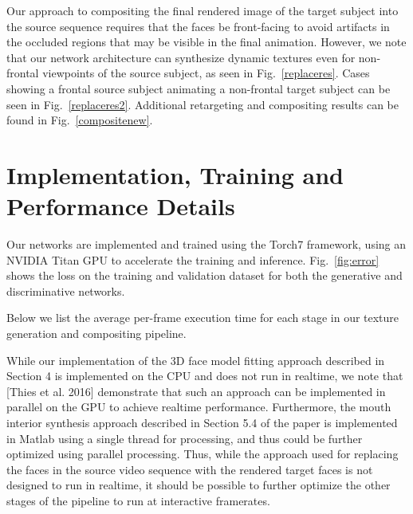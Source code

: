 \documentclass[10pt,twocolumn,letterpaper]{article}
\begin{document}
Our approach to compositing the final rendered image of the target subject into the source sequence requires that the faces be front-facing to avoid artifacts in the occluded regions that may be visible in the final animation. However, we note that our network architecture can synthesize dynamic textures even for non-frontal viewpoints of the source subject, as seen in Fig.~\ref{replaceres}. Cases showing a frontal source subject animating a non-frontal target subject can be seen in Fig.~\ref{replaceres2}. Additional retargeting and compositing results can be found in Fig.~\ref{compositenew}.


\section{Implementation, Training and Performance Details}

Our networks are implemented and trained using the Torch7 framework, using an NVIDIA Titan GPU to accelerate the training and inference. Fig.~\ref{fig:error} shows the loss on the training and validation dataset for both the generative and discriminative networks.

Below we list the average per-frame execution time for each stage in our texture generation and compositing pipeline.

While our implementation of the 3D face model fitting approach described in Section 4 is implemented on the CPU and does not run in realtime, we note that [Thies et al. 2016] demonstrate that such an approach can be implemented in parallel on the GPU to achieve realtime performance. Furthermore, the mouth interior synthesis approach described in Section 5.4 of the paper is implemented in Matlab using a single thread for processing, and thus could be further optimized using parallel processing. Thus, while the approach used for replacing the faces in the source video sequence with the rendered target faces is not designed to run in realtime, it should be possible to further optimize the other stages of the pipeline to run at interactive framerates.


\end{document}
